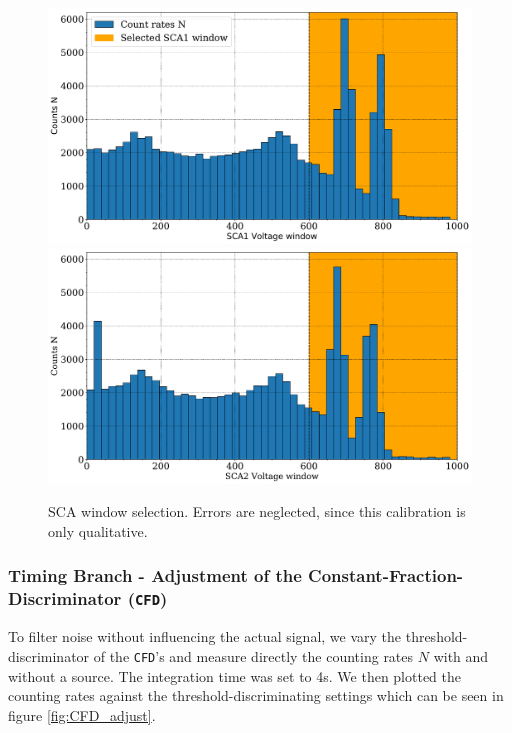 \documentclass[11pt,a4paper,notitlepage]{scrartcl}
\begin{document}
\begin{figure}[htbp]
	\centering
	\includegraphics[width=.49\linewidth]{figs/SCA/SCA1.pdf}
	\includegraphics[width=.49\linewidth]{figs/SCA/SCA2.pdf}
	\caption{SCA window selection. Errors are neglected, since this calibration is only qualitative.}\label{fig:SCA_window}
\end{figure}

\subsubsection{Timing Branch - Adjustment of the Constant-Fraction-Discriminator (\texttt{CFD})}
To filter noise without influencing the actual signal, we vary the threshold-discriminator of the \texttt{CFD}'s and measure directly the counting rates $N$ with and without a source. The integration time was set to 4s. We then plotted the counting rates against the threshold-discriminating settings which can be seen in figure \ref{fig:CFD_adjust}.
\end{document}
